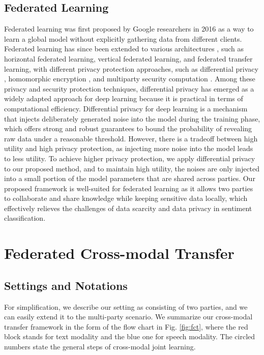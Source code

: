 \documentclass[11pt]{article}
\begin{document}
\subsection{Federated Learning}
Federated learning was first proposed by Google researchers in 2016 \cite{mcmahan2016communication} as a way to learn a global model without explicitly gathering data from different clients. Federated learning has since been extended to various architectures \cite{yang2019federated,yang2020federated}, such as horizontal federated learning, vertical federated learning, and federated transfer learning, with different privacy protection approaches, such as differential privacy \cite{dwork2006calibrating}, homomorphic encryption \cite{rivest1978data}, and multiparty security computation \cite{yao1982protocols}. Among these privacy and security protection techniques, differential privacy has emerged as a widely adapted approach for deep learning because it is practical in terms of computational efficiency. Differential privacy for deep learning is a mechanism that injects deliberately generated noise into the model during the training phase, which offers strong and robust guarantees to bound the probability of revealing raw data under a reasonable threshold. However, there is a tradeoff between high utility and high privacy protection, as injecting more noise into the model leads to less utility. To achieve higher privacy protection, we apply differential privacy to our proposed method, and to maintain high utility, the noises are only injected into a small portion of the model parameters that are shared across parties. Our proposed framework is well-suited for federated learning as it allows two parties to collaborate and share knowledge while keeping sensitive data locally, which effectively relieves the challenges of data scarcity and data privacy in sentiment classification.
\section{Federated Cross-modal Transfer}


\subsection{Settings and Notations}
\label{sec:settings and notations}

For simplification, we describe our setting as consisting of two parties, and we can easily extend it to the multi-party scenario. We summarize our cross-modal transfer framework in the form of the flow chart in Fig. \ref{fig:fct}, where the red block stands for text modality and the blue one for speech modality. The circled numbers state the general steps of cross-modal joint learning. 
\end{document}
